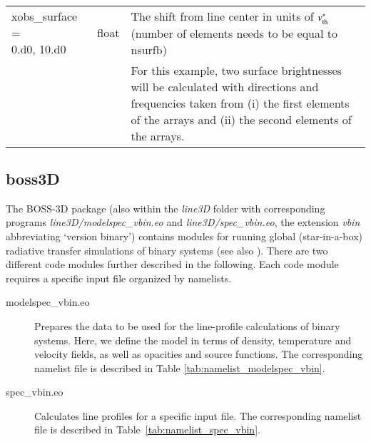 \documentclass[10pt,a4paper]{article}
\makeatletter
\newcommand{\specialcell}[2][c]{%
  \begin{tabular}[#1]{@{}l@{}}#2\end{tabular}}
\makeatother
\begin{document}
\begin{footnotesize}
\begin{longtable}[h]{p{0.24\linewidth}p{0.07\linewidth}p{0.69\linewidth}}
\specialcell[t]{xobs\_surface = \\  0.d0, 10.d0} & float & The shift from line center in units of $v_{\rm th}^{\rm \ast}$ (number of elements needs to be equal to nsurfb)\\
& & For this example, two surface brightnesses will be calculated with directions and frequencies taken from (i) the first elements of the arrays and (ii) the second elements of the arrays. 
%
\end{longtable}
\end{footnotesize}
%
%
%
%
\subsection{boss3D}
\label{subsec:boss3d}
The BOSS-3D package (also within the \textit{line3D} folder with
corresponding programs \textit{line3D/modelspec\_vbin.eo} and
\textit{line3D/spec\_vbin.eo}, the extension \textit{vbin}
abbreviating `version binary') contains modules for running global
(star-in-a-box) radiative transfer simulations of binary
systems (see also \citealt{Hennicker2021}). There are two different code modules further described in the
following. Each code module requires a specific input file organized
by namelists.
%
\begin{description}
\item[modelspec\_vbin.eo] Prepares the data to be used for the
  line-profile calculations of binary systems. Here, we define the
  model in terms of density, temperature and velocity fields, as well
  as opacities and source functions. The corresponding namelist file
  is described in Table \ref{tab:namelist_modelspec_vbin}.
\item[spec\_vbin.eo] Calculates line profiles for a specific input
  file. The corresponding namelist file is described in
  Table~\ref{tab:namelist_spec_vbin}. 
\end{description}
%
%
%
\end{document}
